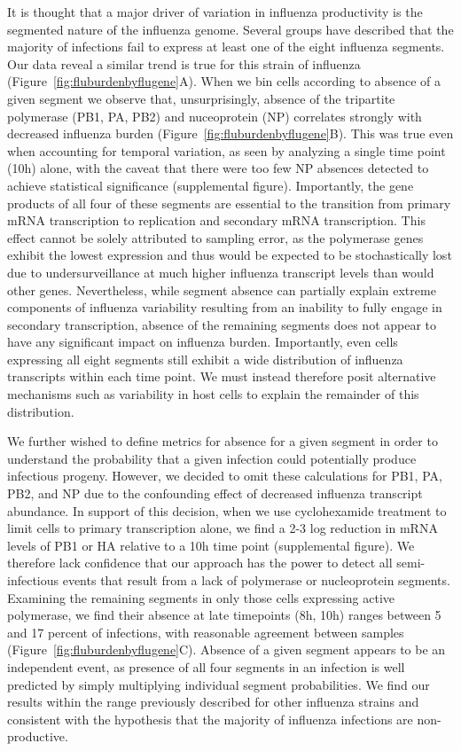 \documentclass[9pt,lineno]{elife}
\begin{document}
It is thought that a major driver of variation in influenza productivity is the segmented nature of the influenza genome.
Several groups have described that the majority of infections fail to express at least one of the eight influenza segments. 
Our data reveal a similar trend is true for this strain of influenza (Figure~\ref{fig:fluburdenbyflugene}A). 
When we bin cells according to absence of a given segment we observe that, unsurprisingly, absence of the tripartite polymerase (PB1, PA, PB2) and nuceoprotein (NP) correlates strongly with decreased influenza burden (Figure~\ref{fig:fluburdenbyflugene}B). 
This was true even when accounting for temporal variation, as seen by analyzing a single time point (10h) alone, with the caveat that there were too few NP absences detected to achieve statistical significance (supplemental figure).
Importantly, the gene products of all four of these segments are essential to the transition from primary mRNA transcription to replication and secondary mRNA transcription. 
This effect cannot be solely attributed to sampling error, as the polymerase genes exhibit the lowest expression and thus would be expected to be stochastically lost due to undersurveillance at much higher influenza transcript levels than would other genes. 
Nevertheless, while segment absence can partially explain extreme components of influenza variability resulting from an inability to fully engage in secondary transcription, absence of the remaining segments does not appear to have any significant impact on influenza burden.
Importantly, even cells expressing all eight segments still exhibit a wide distribution of influenza transcripts within each time point. We must instead therefore posit alternative mechanisms such as variability in host cells to explain the remainder of this distribution.  

We further wished to define metrics for absence for a given segment in order to understand the probability that a given infection could potentially produce infectious progeny. 
However, we decided to omit these calculations for PB1, PA, PB2, and NP due to the confounding effect of decreased influenza transcript abundance. 
In support of this decision, when we use cyclohexamide treatment to limit cells to primary transcription alone, we find a 2-3 log reduction in mRNA levels of PB1 or HA relative to a 10h time point (supplemental figure). 
We therefore lack confidence that our approach has the power to detect all semi-infectious events that result from a lack of polymerase or nucleoprotein segments.
Examining the remaining segments in only those cells expressing active polymerase, we find their absence at late timepoints (8h, 10h) ranges between 5 and 17 percent of infections, with reasonable agreement between samples (Figure~\ref{fig:fluburdenbyflugene}C).
Absence of a given segment appears to be an independent event, as presence of all four segments in an infection is well predicted by simply multiplying individual segment probabilities. 
We find our results within the range previously described for other influenza strains and consistent with the hypothesis that the majority of influenza infections are non-productive.
\end{document}

